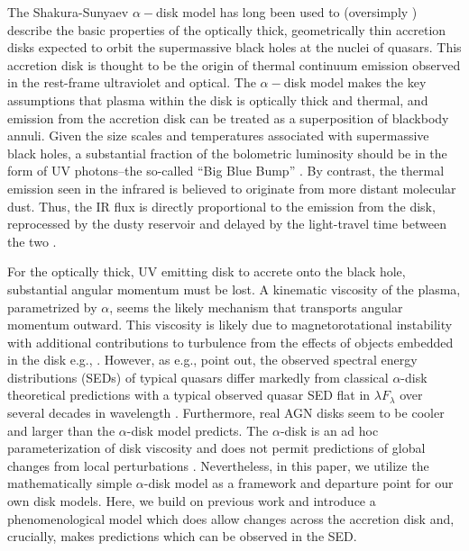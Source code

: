 \documentclass{nature}
\begin{document}
The Shakura-Sunyaev $\alpha-$disk model \cite{SS73} has long been used
to (oversimply \cite{Lawrence2018}) describe the basic properties of
the optically thick, geometrically thin accretion disks expected to
orbit the supermassive black holes at the nuclei of quasars.  This
accretion disk is thought to be the origin of thermal continuum
emission observed in the rest-frame ultraviolet and optical. The
$\alpha-$disk model makes the key assumptions that plasma within the
disk is optically thick and thermal, and emission from the accretion
disk can be treated as a superposition of blackbody annuli. Given the
size scales and temperatures associated with supermassive black holes,
a substantial fraction of the bolometric luminosity should be in the
form of UV photons--the so-called ``Big Blue Bump'' \cite{Shields1978,
Malkan_Sargent1982}. By contrast, the thermal emission seen in the
infrared is believed to originate from more distant molecular dust.
Thus, the IR flux is directly proportional to the emission from
the disk, reprocessed by the dusty reservoir and delayed by the
light-travel time between the two \citep[see ][for
reviews]{Antonucci1993, Perlman2008, Lasota2016}.

For the optically thick, UV emitting disk to accrete onto the black
hole, substantial angular momentum must be lost.  A kinematic
viscosity of the plasma, parametrized by $\alpha$, seems the likely
mechanism that transports angular momentum outward.  This viscosity is
likely due to magnetorotational instability \citep[MRI;
][]{Balbus_Hawley1991} with additional contributions to turbulence
from the effects of objects embedded in the disk e.g.,
\cite{McKernan2014}. However, as e.g., \cite{Koratkar_Blaes1999,
Sirko_Goodman2003} point out, the observed spectral energy
distributions (SEDs) of typical quasars differ markedly from classical
$\alpha$-disk theoretical predictions \citep[][]{SS73, Pringle1981}
with a typical observed quasar SED flat in $\lambda F_{\lambda}$ over
several decades in wavelength \citep{Elvis1994,
Richards2006b}. Furthermore, real AGN disks seem to be cooler
\cite[e.g., ][]{Lawrence2012} and larger \cite[e.g.,][]{Pooley2007,
Morgan2010, Morgan2012, Mosquera2011} than the $\alpha$-disk model
predicts. The $\alpha$-disk is an ad hoc parameterization of disk
viscosity and does not permit predictions of global changes from local
perturbations \cite{King2012}. Nevertheless, in this paper, we utilize
the mathematically simple $\alpha$-disk model as a framework and
departure point for our own disk models. Here, we build on previous
work \citep{Goodman2003, Zimmerman2005, Hameury2009} and introduce a
phenomenological model which does allow changes across the accretion
disk and, crucially, makes predictions which can be observed in the
SED.
 
\end{document}
